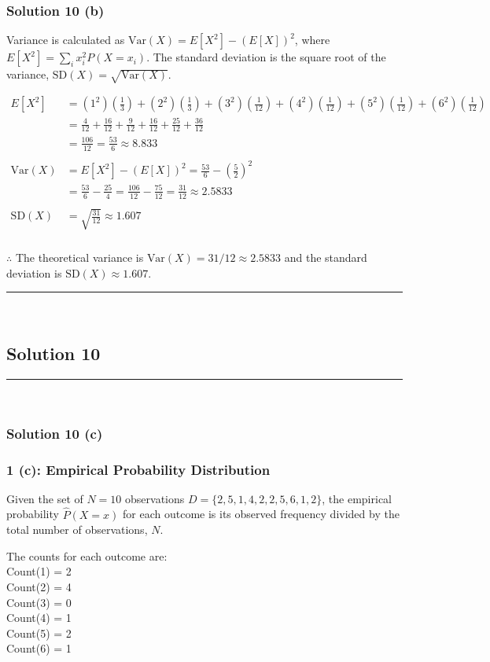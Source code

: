 \documentclass{article}
\begin{document}
\subsubsection*{Solution  10 (b)}

\parbox{\textwidth}{Variance is calculated as $\text{Var}(X) = E[X^2] - (E[X])^2$, where $E[X^2] = \sum_{i} x_i^2 P(X=x_i)$. The standard deviation is the square root of the variance, $\text{SD}(X) = \sqrt{\text{Var}(X)}$.}
\begin{align*}
E[X^2] &= (1^2)\left(\frac{1}{3}\right) + (2^2)\left(\frac{1}{3}\right) + (3^2)\left(\frac{1}{12}\right) + (4^2)\left(\frac{1}{12}\right) + (5^2)\left(\frac{1}{12}\right) + (6^2)\left(\frac{1}{12}\right) \\
&= \frac{4}{12} + \frac{16}{12} + \frac{9}{12} + \frac{16}{12} + \frac{25}{12} + \frac{36}{12} \\
&= \frac{106}{12} = \frac{53}{6} \approx 8.833 \\
\\
\text{Var}(X) &= E[X^2] - (E[X])^2 = \frac{53}{6} - \left(\frac{5}{2}\right)^2 \\
&= \frac{53}{6} - \frac{25}{4} = \frac{106}{12} - \frac{75}{12} = \frac{31}{12} \approx 2.5833 \\
\\
\text{SD}(X) &= \sqrt{\frac{31}{12}} \approx 1.607
\end{align*}
\subsubsection*{\normalfont}{$\therefore$ The theoretical variance is $\text{Var}(X) = 31/12 \approx 2.5833$ and the standard deviation is $\text{SD}(X) \approx 1.607$.}


\noindent\rule{\textwidth}{0.4pt}\\

\newpage

\subsection*{Solution 10}
\noindent\rule{\textwidth}{0.4pt}\\
\subsubsection*{Solution  10 (c)}

\subsubsection*{1 (c): Empirical Probability Distribution}
\parbox{\textwidth}{Given the set of $N=10$ observations $D = \{2, 5, 1, 4, 2, 2, 5, 6, 1, 2\}$, the empirical probability $\hat{P}(X=x)$ for each outcome is its observed frequency divided by the total number of observations, $N$.}
\parbox{\textwidth}{The counts for each outcome are: \\ Count(1) = 2 \\ Count(2) = 4 \\ Count(3) = 0 \\ Count(4) = 1 \\ Count(5) = 2 \\ Count(6) = 1}
\end{document}
